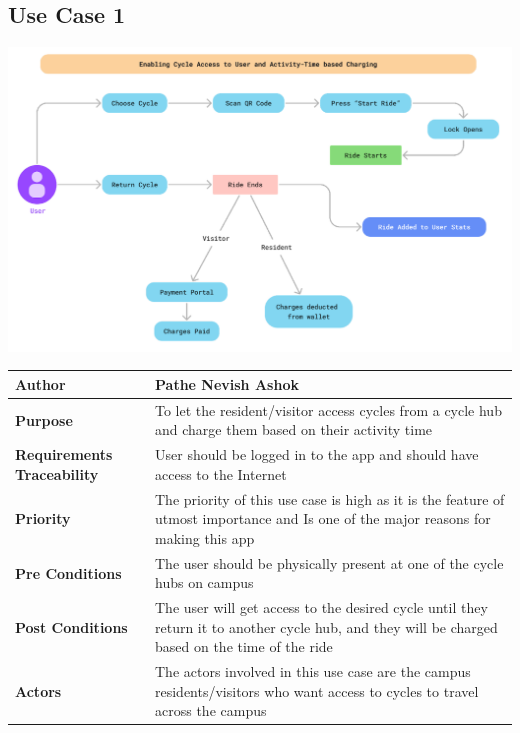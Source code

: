 \documentclass{scrreprt}
\begin{document}
\subsection{Use Case 1}
\begin{center}
\includegraphics*[scale=0.5]{usecase-1.png}
\begin{tabular}{|l|p{10cm}|}
    \hline
    \textbf{Author} & Pathe Nevish Ashok \\
    \hline
    \textbf{Purpose} & To let the resident/visitor access cycles from a cycle hub and charge them based on their activity time \\
    \hline
    \textbf{Requirements Traceability} &User should be logged in to the app and should have access to the Internet \\
    \hline
    \textbf{Priority} &The priority of this use case is high as it is the feature of utmost  importance and Is one of the major reasons for making this app \\
    \hline
    \textbf{Pre Conditions} &The user should be physically present at one of the cycle hubs on campus \\
    \hline
    \textbf{Post Conditions} & The user will get access to the desired cycle until they return it to another cycle hub, and they will be charged based on the time of the ride\\
    \hline
    \textbf{Actors} & The actors involved in this use case are the campus residents/visitors who want access to cycles to travel across the campus\\
    \hline
\end{tabular}
\end{center}
\end{document}
